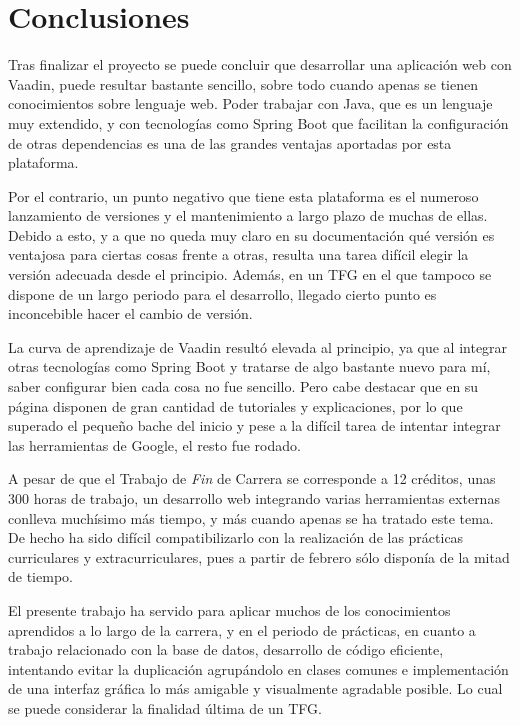 
\section{Conclusiones}
Tras finalizar el proyecto se puede concluir que desarrollar una aplicación web con Vaadin, puede resultar bastante sencillo, sobre todo cuando apenas se tienen conocimientos sobre lenguaje web. Poder trabajar con Java, que es un lenguaje muy extendido, y con tecnologías como Spring Boot que facilitan la configuración de otras dependencias es una de las grandes ventajas aportadas por esta plataforma.

Por el contrario, un punto negativo que tiene esta plataforma es el numeroso lanzamiento de versiones y el mantenimiento a largo plazo de muchas de ellas. Debido a esto, y a que no queda muy claro en su documentación qué versión es ventajosa para ciertas cosas frente a otras, resulta una tarea difícil elegir la versión adecuada desde el principio. Además, en un TFG en el que tampoco se dispone de un largo periodo para el desarrollo, llegado cierto punto es inconcebible hacer el cambio de versión.

La curva de aprendizaje de Vaadin resultó elevada al principio, ya que al integrar otras tecnologías como Spring Boot y tratarse de algo bastante nuevo para mí, saber configurar bien cada cosa no fue sencillo. Pero cabe destacar que en su página disponen de gran cantidad de tutoriales y explicaciones, por lo que superado el pequeño bache del inicio y pese a la difícil tarea de intentar integrar las herramientas de Google, el resto fue rodado.

A pesar de que el Trabajo de \textit{Fin} de Carrera se corresponde a 12 créditos, unas 300 horas de trabajo, un desarrollo web integrando varias herramientas externas conlleva muchísimo más tiempo, y más cuando apenas se ha tratado este tema. De hecho ha sido difícil compatibilizarlo con la realización de las prácticas curriculares y extracurriculares, pues a partir de febrero sólo disponía de la mitad de tiempo.

El presente trabajo ha servido para aplicar muchos de los conocimientos aprendidos a lo largo de la carrera, y en el periodo de prácticas, en cuanto a trabajo relacionado con la base de datos, desarrollo de código eficiente, intentando evitar la duplicación agrupándolo en clases comunes e implementación de una interfaz gráfica lo más amigable y visualmente agradable posible. Lo cual se puede considerar la finalidad última de un TFG.

